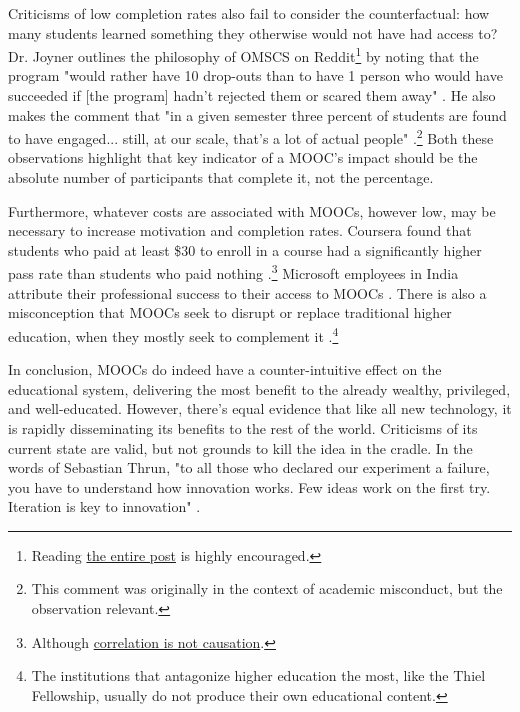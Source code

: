\documentclass[
	letterpaper, %
]{jdf}
\begin{document}
Criticisms of low completion rates also fail to consider the counterfactual: how many students learned something they otherwise would not have had access to? Dr. Joyner outlines the philosophy of OMSCS on Reddit\footnote{Reading \href{https://www.reddit.com/r/OMSCS/comments/sgg9ne/comment/huwvec7/}{the entire post} is highly encouraged.} by noting that the program "would rather have 10 drop-outs than to have 1 person who would have succeeded if [the program] hadn't rejected them or scared them away" . He also makes the comment that "in a given semester three percent of students are found to have engaged... still, at our scale, that's a lot of actual people" .\footnote{This comment was originally in the context of academic misconduct, but the observation relevant.} Both these observations highlight that key indicator of a MOOC's impact should be the absolute number of participants that complete it, not the percentage.

Furthermore, whatever costs are associated with MOOCs, however low, may be necessary to increase motivation and completion rates. Coursera found that students who paid at least \$30 to enroll in a course had a significantly higher pass rate than students who paid nothing .\footnote{Although \href{https://xkcd.com/552/}{correlation is not causation}.} Microsoft employees in India attribute their professional success to their access to MOOCs . There is also a misconception that MOOCs seek to disrupt or replace traditional higher education, when they mostly seek to complement it .\footnote{The institutions that antagonize higher education the most, like the Thiel Fellowship, usually do not produce their own educational content.}

In conclusion, MOOCs do indeed have a counter-intuitive effect on the educational system, delivering the most benefit to the already wealthy, privileged, and well-educated. However, there's equal evidence that like all new technology, it is rapidly disseminating its benefits to the rest of the world. Criticisms of its current state are valid, but not grounds to kill the idea in the cradle. In the words of Sebastian Thrun, "to all those who declared our experiment a failure, you have to understand how innovation works. Few ideas work on the first try. Iteration is key to innovation" .

\printbibliography{}
\end{document}
